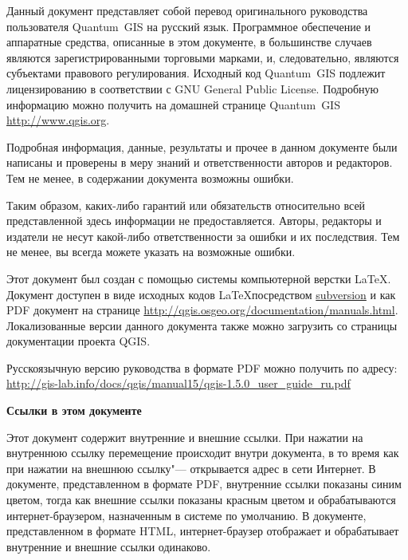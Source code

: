 \frontmatter
\pagestyle{scrplain}
\vspace{1cm}


Данный документ представляет собой перевод оригинального руководства
пользователя Quantum~GIS на русский язык. Программное обеспечение и
аппаратные средства, описанные в этом документе, в большинстве случаев
являются зарегистрированными торговыми марками, и, следовательно, являются
субъектами правового регулирования. Исходный код Quantum~GIS подлежит
лицензированию в соответствии с GNU General Public License. Подробную
информацию можно получить на домашней странице Quantum~GIS
\url{http://www.qgis.org}.
\par\bigskip
Подробная информация, данные, результаты и прочее в данном документе
были написаны и проверены в меру знаний и ответственности авторов и
редакторов. Тем не менее, в содержании документа возможны ошибки.
\par\bigskip
Таким образом, каких-либо гарантий или обязательств
относительно всей представленной здесь информации не предоставляется.
Авторы, редакторы и издатели не несут какой-либо ответственности за ошибки
и их последствия. Тем не менее, вы всегда можете указать на возможные ошибки.
\par\bigskip
Этот документ был создан с помощью системы компьютерной верстки \LaTeX.
Документ доступен в виде исходных кодов \LaTeX посредством
\href{http://wiki.qgis.org/qgiswiki/DocumentationWritersCorner}{subversion}
и как PDF документ на странице
\url{http://qgis.osgeo.org/documentation/manuals.html}.
Локализованные версии данного документа также можно загрузить со
страницы документации проекта QGIS.

Русскоязычную версию руководства в формате PDF можно получить по адресу:\\
\url{http://gis-lab.info/docs/qgis/manual15/qgis-1.5.0_user_guide_ru.pdf}

\vspace{1cm}
\noindent
\textbf{Ссылки в этом документе}
\par\bigskip
Этот документ содержит внутренние и внешние ссылки. При нажатии на
внутреннюю ссылку перемещение происходит внутри документа, в то время
как при нажатии на внешнюю ссылку"--- открывается адрес в сети Интернет.
В документе, представленном в формате PDF, внутренние ссылки показаны
синим цветом, тогда как внешние ссылки показаны красным цветом и
обрабатываются интернет-браузером, назначенным в системе по умолчанию. В
документе, представленном в формате HTML, интернет-браузер отображает и
обрабатывает внутренние и внешние ссылки одинаково.

